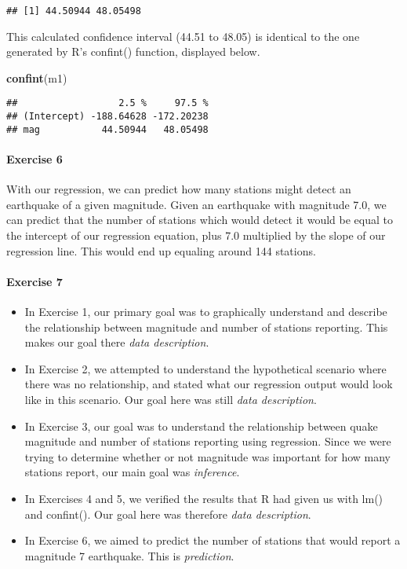 \documentclass[]{article}
\newenvironment{Shaded}{\begin{snugshade}}{\end{snugshade}}
\newcommand{\KeywordTok}[1]{\textcolor[rgb]{0.13,0.29,0.53}{\textbf{#1}}}
\newcommand{\NormalTok}[1]{#1}
\providecommand{\tightlist}{%
  \setlength{\itemsep}{0pt}\setlength{\parskip}{0pt}}
\let\oldparagraph\paragraph
\renewcommand{\paragraph}[1]{\oldparagraph{#1}\mbox{}}
\begin{document}
\begin{verbatim}
## [1] 44.50944 48.05498
\end{verbatim}

This calculated confidence interval (44.51 to 48.05) is identical to the
one generated by R's confint() function, displayed below.

\begin{Shaded}
\begin{Highlighting}[]
\KeywordTok{confint}\NormalTok{(m1)}
\end{Highlighting}
\end{Shaded}

\begin{verbatim}
##                  2.5 %     97.5 %
## (Intercept) -188.64628 -172.20238
## mag           44.50944   48.05498
\end{verbatim}

\paragraph{Exercise 6}\label{exercise-6}

With our regression, we can predict how many stations might detect an
earthquake of a given magnitude. Given an earthquake with magnitude 7.0,
we can predict that the number of stations which would detect it would
be equal to the intercept of our regression equation, plus 7.0
multiplied by the slope of our regression line. This would end up
equaling around 144 stations.

\paragraph{Exercise 7}\label{exercise-7}

\begin{itemize}
\tightlist
\item
  In Exercise 1, our primary goal was to graphically understand and
  describe the relationship between magnitude and number of stations
  reporting. This makes our goal there \emph{data description}.
\item
  In Exercise 2, we attempted to understand the hypothetical scenario
  where there was no relationship, and stated what our regression output
  would look like in this scenario. Our goal here was still \emph{data
  description}.
\item
  In Exercise 3, our goal was to understand the relationship between
  quake magnitude and number of stations reporting using regression.
  Since we were trying to determine whether or not magnitude was
  important for how many stations report, our main goal was
  \emph{inference}.
\item
  In Exercises 4 and 5, we verified the results that R had given us with
  lm() and confint(). Our goal here was therefore \emph{data
  description}.
\item
  In Exercise 6, we aimed to predict the number of stations that would
  report a magnitude 7 earthquake. This is \emph{prediction}.
\end{itemize}
\end{document}
